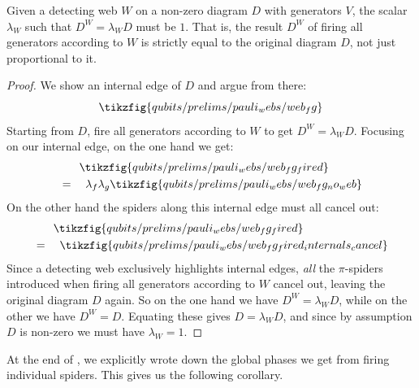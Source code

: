 \begin{lemma}\label{lem:firing_detector_web_propto}
    Given a detecting web $W$ on a non-zero diagram $D$ with generators $V$, the scalar $\lambda_W$ such that $D^{W} = \lambda_W D$ must be $1$.
    That is, the result $D^{W}$ of firing all generators according to $W$ is strictly equal to the original diagram $D$, not just proportional to it.
    \begin{proof}
        We show an internal edge of $D$ and argue from there:
        \begin{equation}
            \tikzfig{qubits/prelims/pauli_webs/web_fg}
        \end{equation}
        Starting from $D$, fire all generators according to $W$ to get $D^{W} = \lambda_W D$.
        Focusing on our internal edge, on the one hand we get:
        \begin{equation}
            \begin{aligned}
                &\phantom{=}\quad \tikzfig{qubits/prelims/pauli_webs/web_fg_fired} \\
                &=\quad \lambda_f \lambda_g \tikzfig{qubits/prelims/pauli_webs/web_fg_no_web}
            \end{aligned}
        \end{equation}
        On the other hand the spiders along this internal edge must all cancel out:
        \begin{equation}
            \begin{aligned}
                &\phantom{=}\quad \tikzfig{qubits/prelims/pauli_webs/web_fg_fired} \\
                &=\quad \tikzfig{qubits/prelims/pauli_webs/web_fg_fired_internals_cancel}
            \end{aligned}
        \end{equation}
        Since a detecting web exclusively highlights internal edges, \textit{all} the $\pi$-spiders introduced when firing all generators according to $W$ cancel out, leaving the original diagram $D$ again.
        So on the one hand we have $D^{W} = \lambda_W D$, while on the other we have $D^{W} = D$.
        Equating these gives $D = \lambda_W D$, and since by assumption $D$ is non-zero we must have $\lambda_W = 1$.
    \end{proof}
\end{lemma}

At the end of , we explicitly wrote down the global phases we get from firing individual spiders.
This gives us the following corollary.

